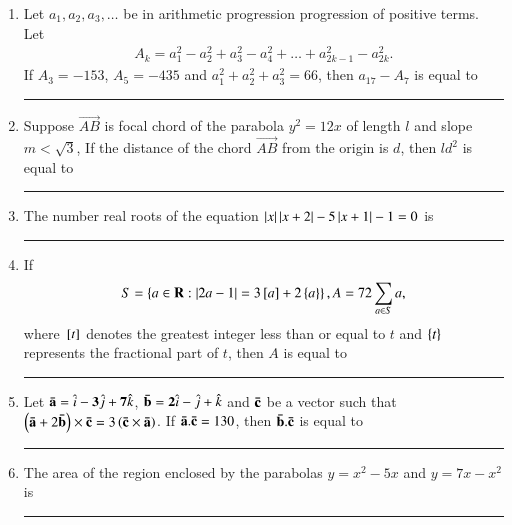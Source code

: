 \documentclass[journal]{IEEEtran}
\numberwithin{equation}{enumi}
\numberwithin{figure}{enumi}
\begin{document}
\begin{enumerate}

    \item
    Let $a_1, a_2, a_3, \dots $ be in arithmetic progression progression of positive terms. Let
    \begin{align*}
        A_k = a_1^2 - a_2^2 + a_3^2 - a_4^2 + \dots + a_{2k-1}^2 -a_{2k}^2.
    \end{align*} 
    If $A_3 = -153$, $A_5 = -435$ and $a_1^2 + a_2^2 + a_3^2 = 66$, then $a_{17} - A_7$ is equal to \rule{1cm}{0.1pt}

    \hfill{}

    \item 
    Suppose $\vec{AB}$ is focal chord of the parabola $y^2 = 12x$ of length $l$ and slope $m < \sqrt{3}$, If the distance of the chord $\vec{AB}$ from the origin is $d$, then $ld^2$ is equal to \rule{1cm}{0.1pt}

    \hfill{}

    \item 
    The number real roots of the equation $\abs{x}\abs{x + 2} -  5\abs{x + 1} - 1 = 0$ is \rule{1cm}{0.1pt}

    \hfill{}

    \item 
    If 
    \begin{align*}
        S = \cbrak{a \in \mathbf{R} : \abs{2a - 1} = 3\sbrak{a} + 2\cbrak{a}}, A = 72\sum_{a \in S}a, 
    \end{align*}
    where $\sbrak{t}$ denotes the greatest integer less than or equal to $t$ and $\cbrak{t}$ represents the fractional part of $t$, then $A$ is equal to \rule{1cm}{0.1pt}

    \hfill{}

    \item 
    Let $\vec{\Bar{a}} = \hat{i} - \vec{3}\hat{j} + \vec{7}\hat{k}$, $\vec{\Bar{b}} = \vec{2}\hat{i} - \hat{j} + \hat{k}$ and $\vec{\Bar{c}}$ be a vector such that $\brak{\vec{\Bar{a}} + 2\vec{\Bar{b}}} \times \vec{\Bar{c}} = 3\brak{\vec{\Bar{c}} \times \vec{\Bar{a}}}$. If $\vec{\Bar{a}} . \vec{\Bar{c}} = 130$, then $\vec{\Bar{b}} . \vec{\Bar{c}}$ is equal to \rule{1cm}{0.1pt}

    \hfill{}
    
    \item 
    The area of the  region enclosed by the parabolas $y = x^2 - 5x$ and $y = 7x - x^2$ is \rule{1cm}{0.1pt}


\end{enumerate}
\end{document}
